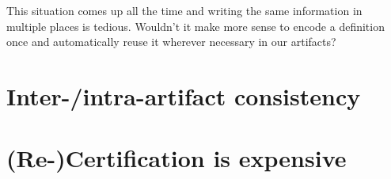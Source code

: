 \documentclass[twocolumn]{article}
\begin{document}
This situation comes up all the time and writing the same information in 
multiple places is tedious. Wouldn't it  
make more sense to encode a definition once and 
automatically reuse it wherever necessary in our artifacts?


\section{Inter-/intra-artifact consistency}



\section{(Re-)Certification is expensive}

\cite{CSA1999,CSA2009,CDRH2002,FDA2014}



  
\end{document}

